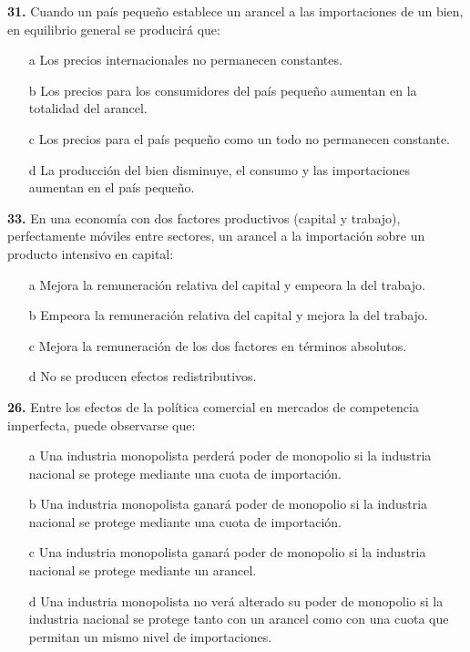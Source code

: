 \documentclass{nuevotema}
\begin{document}
\textbf{31.} Cuando un país pequeño establece un arancel a las importaciones de un bien, en equilibrio general se producirá que:

\begin{itemize}
	\item[a] Los precios internacionales no permanecen constantes.
	\item[b] Los precios para los consumidores del país pequeño aumentan en la totalidad del arancel.
	\item[c] Los precios para el país pequeño como un todo no permanecen constante.
	\item[d] La producción del bien disminuye, el consumo y las importaciones aumentan en el país pequeño.
\end{itemize}


\textbf{33.} En una economía con dos factores productivos (capital y trabajo), perfectamente móviles entre sectores, un arancel a la importación sobre un producto intensivo en capital:

\begin{itemize}
	\item[a] Mejora la remuneración relativa del capital y empeora la del trabajo.
	\item[b] Empeora la remuneración relativa del capital y mejora la del trabajo.
	\item[c] Mejora la remuneración de los dos factores en términos absolutos.
	\item[d] No se producen efectos redistributivos.
\end{itemize}


\textbf{26.} Entre los efectos de la política comercial en mercados de competencia imperfecta, puede observarse que:

\begin{itemize}
 	\item[a] Una industria monopolista perderá poder de monopolio si la industria nacional se protege mediante una cuota de importación.
	\item[b] Una industria monopolista ganará poder de monopolio si la industria nacional se protege mediante una cuota de importación.
	\item[c] Una industria monopolista ganará poder de monopolio si la industria nacional se protege mediante un arancel.
	\item[d] Una industria monopolista no verá alterado su poder de monopolio si la industria nacional se protege tanto con un arancel como con una cuota que permitan un mismo nivel de importaciones.
\end{itemize}
\end{document}

